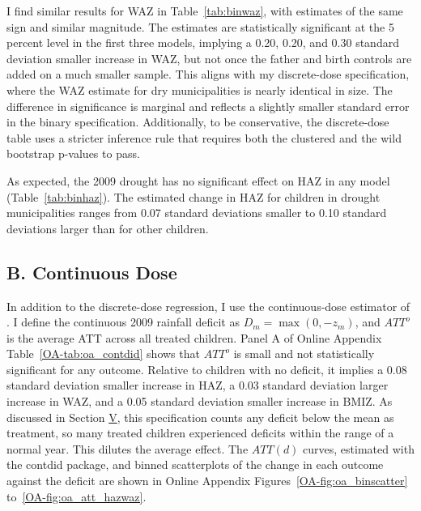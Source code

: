 
I find similar results for WAZ in Table~\ref{tab:binwaz}, with estimates of the same sign and similar magnitude. The estimates are statistically significant at the 5 percent level in the first three models, implying a 0.20, 0.20, and 0.30 standard deviation smaller increase in WAZ, but not once the father and birth controls are added on a much smaller sample. This aligns with my discrete-dose specification, where the WAZ estimate for dry municipalities is nearly identical in size. The difference in significance is marginal and reflects a slightly smaller standard error in the binary specification. Additionally, to be conservative, the discrete-dose table uses a stricter inference rule that requires both the clustered and the wild bootstrap p-values to pass.


As expected, the 2009 drought has no significant effect on HAZ in any model (Table~\ref{tab:binhaz}). The estimated change in HAZ for children in drought municipalities ranges from 0.07 standard deviations smaller to 0.10 standard deviations larger than for other children.

\subsection*{B. Continuous Dose}

In addition to the discrete-dose regression, I use the continuous-dose estimator of \textcite{callawayDifferenceinDifferencesContinuousTreatment2024}. I define the continuous 2009 rainfall deficit as $D_m = \max(0, -z_m)$, and $ATT^o$ is the average ATT across all treated children. Panel A of Online Appendix Table~\ref{OA-tab:oa_contdid} shows that $ATT^o$ is small and not statistically significant for any outcome. Relative to children with no deficit, it implies a 0.08 standard deviation smaller increase in HAZ, a 0.03 standard deviation larger increase in WAZ, and a 0.05 standard deviation smaller increase in BMIZ. As discussed in Section \hyperref[sec:V]{V}, this specification counts any deficit below the mean as treatment, so many treated children experienced deficits within the range of a normal year. This dilutes the average effect. The $ATT(d)$ curves, estimated with the contdid package, and binned scatterplots of the change in each outcome against the deficit are shown in Online Appendix Figures~\ref{OA-fig:oa_binscatter} to~\ref{OA-fig:oa_att_hazwaz}.

